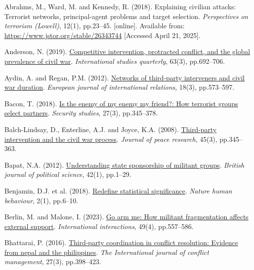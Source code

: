 \documentclass[
]{article}
\newlength{\cslhangindent}
\newenvironment{CSLReferences}[2] %
 {\begin{list}{}{%
  \setlength{\itemindent}{0pt}
  \setlength{\leftmargin}{0pt}
  \setlength{\parsep}{0pt}
  \ifodd #1
   \setlength{\leftmargin}{\cslhangindent}
   \setlength{\itemindent}{-1\cslhangindent}
  \fi
  \setlength{\itemsep}{#2\baselineskip}}}
 {\end{list}}
\begin{document}
\label{refs}
\begin{CSLReferences}{0}{1}
Abrahms, M., Ward, M. and Kennedy, R. (2018). Explaining civilian
attacks: Terrorist networks, principal-agent problems and target
selection. \emph{Perspectives on terrorism (Lowell)}, 12(1), pp.23--45.
{[}online{]}. Available from:
\url{https://www.jstor.org/stable/26343744} {[}Accessed April 21,
2025{]}.

Anderson, N. (2019).
\href{https://doi.org/10.1093/isq/sqz037}{Competitive intervention,
protracted conflict, and the global prevalence of civil war}.
\emph{International studies quarterly}, 63(3), pp.692--706.

Aydin, A. and Regan, P.M. (2012).
\href{https://doi.org/10.1177/1354066111403515}{Networks of third-party
interveners and civil war duration}. \emph{European journal of
international relations}, 18(3), pp.573--597.

Bacon, T. (2018).
\href{https://doi.org/10.1080/09636412.2017.1416813}{Is the enemy of my
enemy my friend?: How terrorist groups select partners}. \emph{Security
studies}, 27(3), pp.345--378.

Balch-Lindsay, D., Enterline, A.J. and Joyce, K.A. (2008).
\href{https://doi.org/10.1177/0022343308088815}{Third-party intervention
and the civil war process}. \emph{Journal of peace research}, 45(3),
pp.345--363.

Bapat, N.A. (2012).
\href{https://doi.org/10.1017/S000712341100007X}{Understanding state
sponsorship of militant groups}. \emph{British journal of political
science}, 42(1), pp.1--29.

Benjamin, D.J. et al. (2018).
\href{https://doi.org/10.1038/s41562-017-0189-z}{Redefine statistical
significance}. \emph{Nature human behaviour}, 2(1), pp.6--10.

Berlin, M. and Malone, I. (2023).
\href{https://doi.org/10.1080/03050629.2023.2201881}{Go arm me: How
militant fragmentation affects external support}. \emph{International
interactions}, 49(4), pp.557--586.

Bhattarai, P. (2016).
\href{https://doi.org/10.1108/IJCMA-08-2014-0066}{Third-party
coordination in conflict resolution: Evidence from nepal and the
philippines}. \emph{The International journal of conflict management},
27(3), pp.398--423.


\end{CSLReferences}
\end{document}

